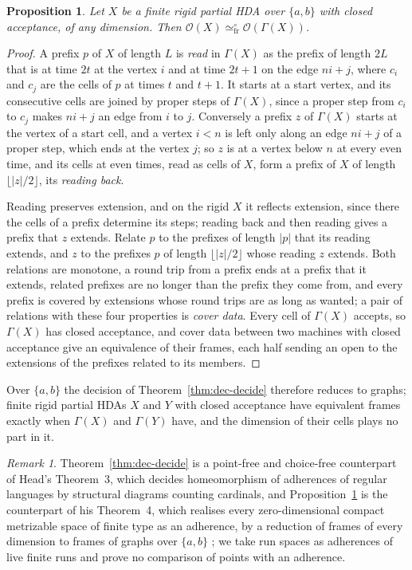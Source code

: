 \documentclass{lmcs}
\newtheorem{proposition}[theorem]{Proposition}
\theoremstyle{definition}
\theoremstyle{remark}
\newtheorem{remark}[theorem]{Remark}
\newcommand{\Op}{\mathcal{O}}
\newcommand{\ab}{\{a,b\}}
\newcommand{\dimn}[1]{\lvert #1\rvert}
\newcommand{\eqFrF}{\simeq^{\circ}_{\mathrm{fr}}}
\providecommand{\grph}[1]{\Gamma(#1)}
\begin{document}
\begin{proposition}\label{prop:dec-graph}
Let $X$ be a finite rigid partial HDA over $\ab$ with closed acceptance, of any dimension.
Then $\Op(X)\eqFrF\Op(\grph{X})$.
\end{proposition}

\begin{proof}
A prefix $p$ of $X$ of length $L$ is \emph{read} in $\grph{X}$ as the prefix of length $2L$ that is at time $2t$ at
the vertex $i$ and at time $2t+1$ on the edge $ni+j$, where $c_i$ and $c_j$ are the cells of $p$ at times $t$ and
$t+1$. It starts at a start vertex, and its consecutive cells are joined by
proper steps of $\grph{X}$, since a proper step from $c_i$ to $c_j$ makes $ni+j$ an edge from $i$ to
$j$. Conversely a prefix $z$ of $\grph{X}$ starts at the vertex
of a start cell, and a vertex $i<n$ is left only along an edge $ni+j$ of a proper step, which ends at the vertex $j$;
so $z$ is at a vertex below $n$ at every even time, and its cells at even times, read as cells of $X$, form a prefix of
$X$ of length $\lfloor\dimn{z}/2\rfloor$, its \emph{reading back}.

Reading preserves extension, and on the rigid $X$ it reflects extension, since there the cells of a prefix determine
its steps; reading back and then reading gives a prefix that
$z$ extends. Relate $p$ to the prefixes of length $\dimn{p}$ that its reading extends,
and $z$ to the prefixes $p$ of length $\lfloor\dimn{z}/2\rfloor$ whose reading $z$ extends. Both relations are
monotone, a round trip from a prefix ends at a prefix that it extends, related prefixes are no longer than the
prefix they come from, and every prefix is covered by extensions whose round trips are as long as wanted; a pair of
relations with these four properties is \emph{cover data}. Every cell of $\grph{X}$ accepts,
so $\grph{X}$ has closed acceptance, and cover data between two machines with closed
acceptance give an equivalence of their frames, each half sending an open to the extensions of the prefixes related to
its members.
\end{proof}

Over $\ab$ the decision of Theorem~\ref{thm:dec-decide} therefore reduces to graphs; finite rigid partial HDAs $X$
and $Y$ with closed acceptance have equivalent frames exactly when $\grph{X}$ and $\grph{Y}$ have, and the dimension of
their cells plays no part in it.

\begin{remark}\label{rem:dec-head}
Theorem~\ref{thm:dec-decide} is a point-free and choice-free counterpart of Head's Theorem~3, which decides
homeomorphism of adherences of regular languages by structural diagrams counting cardinals, and
Proposition~\ref{prop:dec-graph} is the counterpart of his Theorem~4, which realises every zero-dimensional compact metrizable space
of finite type as an adherence, by a reduction of frames of every dimension to frames of graphs over $\ab$
\cite{Head86};
we take run spaces as adherences of live finite runs and prove no comparison of points with an adherence.
\end{remark}
\end{document}
